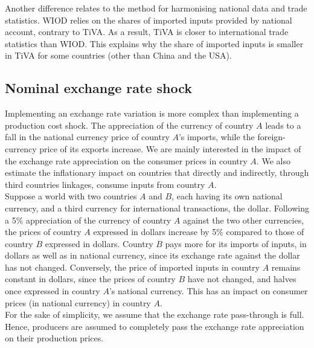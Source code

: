 \documentclass[12pt,a4paper]{paper}
\begin{document}
Another difference relates to the method for harmonising national data and trade statistics. WIOD relies on the shares of imported inputs provided by national account, contrary to TiVA. As a result, TiVA is closer to international trade statistics than WIOD. This explains why the share of imported inputs is smaller in TiVA for some countries (other than China and the USA).

\subsection{Nominal exchange rate shock} \label{subsec:chocchange}

Implementing an exchange rate variation is more complex than implementing a production cost shock. 
The appreciation of the currency of country $A$ leads to a fall in the national currency price of country $A$'s imports, while the foreign-currency price of its exports increase. 
We are mainly interested in the impact of the exchange rate appreciation on the consumer prices in country $A$. 
We also estimate the inflationary impact on countries that directly and indirectly, through third countries linkages, consume inputs from country $A$.\\
Suppose a world with two countries $A$ and $B$, each having its own national currency, and a third currency for international transactions, the dollar.
Following a 5$\%$ appreciation of the currency of country $A$ against the two other currencies, the prices of country $A$ expressed in dollars increase by 5$\%$ compared to those of country $B$ expressed in dollars. 
Country $B$ pays more for its imports of inputs, in dollars as well as in national currency, since its exchange rate against the dollar has not changed. 
Conversely, the price of imported inputs in country $A$ remains constant in dollars, since the prices of country $B$ have not changed, and halves once expressed in country $A$'s national currency. 
This has an impact on consumer prices (in national currency) in country $A$.\\
For the sake of simplicity, we assume that the exchange rate pass-through is full. Hence, producers are assumed to completely pass the exchange rate appreciation on their production prices. 
\end{document}
